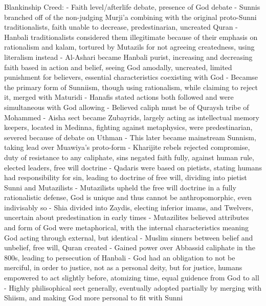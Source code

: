 \documentclass[11 pt, twoside]{article}
\begin{document}
Blankinship Creed:
- Faith level/afterlife debate, presence of God debate
- Sunnis branched off of the non-judging Murji'a combining with the original proto-Sunni traditionalists, faith unable to decrease, predestinarian, uncreated Quran
	- Hanbali traditionalists considered them illegitimate because of their emphasis on rationalism and kalam, tortured by Mutazils for not agreeing createdness, using literalism instead
		- Al-Ashari became Hanbali purist, increasing and decreasing faith based in action and belief, seeing God amodally, uncreated, limited punishment for believers, essential characteristics coexisting with God
			- Becamse the primary form of Sunniism, though using rationalism, while claiming to reject it, merged with Maturidi
	- Hanafis stated actions both followed and were simultaneous with God allowing
	- Believed caliph must be of Quraysh tribe of Mohammed
	- Aisha sect became Zubayrids, largely acting as intellectual memory keepers, located in Medinna, fighting against metaphysics, were predestinarian, severed because of debate on Uthman
		- This later became mainstream Sunnism, taking lead over Muawiya's proto-form
- Kharijite rebels rejected compromise, duty of resistance to any caliphate, sins negated faith fully, against human rule, elected leaders, free will doctrine
- Qadaris were based on pietists, stating humans had responsibility for sin, leading to doctrine of free will, dividing into pietist Sunni and Mutazilists
	- Mutazilists upheld the free will doctrine in a fully rationalistic defense, God is unique and thus cannot be anthropomorphic, even indivisably so
- Shia divided into Zaydis, electing inferior imams, and Twelvers, uncertain about predestination in early times
- Mutazilites believed attributes and form of God were metaphorical, with the internal characteristics meaning God acting through external, but identical
	- Muslim sinners between belief and unbelief, free will, Quran created
	- Gained power over Abbassid caliphate in the 800s, leading to persecution of Hanbali
	- God had an obligation to not be merciful, in order to justice, not as a personal deity, but for justice, humans empowered to act slightly before, atomizing time, equal guidence from God to all
	- Highly philisophical sect generally, eventually adopted partially by merging with Shiism, and making God more personal to fit with Sunni
\end{document}
